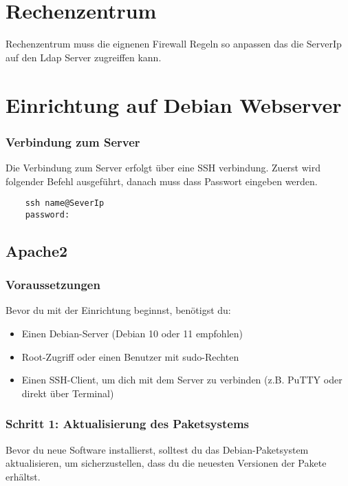 \documentclass[a4paper,12pt]{article}
\begin{document}
\section{Rechenzentrum}

Rechenzentrum muss die eignenen Firewall Regeln so anpassen das die ServerIp auf den Ldap Server zugreiffen kann.




\section{Einrichtung auf Debian Webserver}

\subsubsection{Verbindung zum Server}

Die Verbindung zum Server erfolgt über eine SSH verbindung. 
Zuerst wird folgender Befehl ausgeführt, danach muss dass Passwort eingeben werden. 
 
\begin{lstlisting}
    ssh name@SeverIp
    password:  
\end{lstlisting}

\subsection{Apache2}
\subsubsection{Voraussetzungen}
Bevor du mit der Einrichtung beginnst, benötigst du:
\begin{itemize}
    \item Einen Debian-Server (Debian 10 oder 11 empfohlen)
    \item Root-Zugriff oder einen Benutzer mit sudo-Rechten
    \item Einen SSH-Client, um dich mit dem Server zu verbinden (z.B. PuTTY oder direkt über Terminal)
\end{itemize}

\subsubsection{Schritt 1: Aktualisierung des Paketsystems}
Bevor du neue Software installierst, solltest du das Debian-Paketsystem aktualisieren, um sicherzustellen, dass du die neuesten Versionen der Pakete erhältst.
\end{document}
